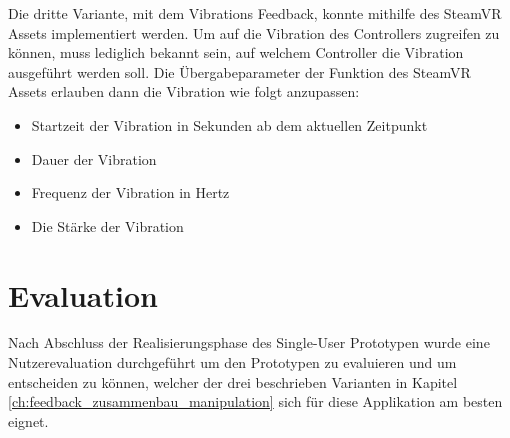 Die dritte Variante, mit dem Vibrations Feedback, konnte mithilfe des SteamVR Assets implementiert werden. Um auf die Vibration des Controllers zugreifen zu können, muss lediglich bekannt sein, auf welchem Controller die Vibration ausgeführt werden soll. Die Übergabeparameter der Funktion des SteamVR Assets erlauben dann die Vibration wie folgt anzupassen:

\begin{itemize} [itemsep=1pt,topsep=0pt]
	\item Startzeit der Vibration in Sekunden ab dem aktuellen Zeitpunkt
	\item Dauer der Vibration
	\item Frequenz der Vibration in Hertz
	\item Die Stärke der Vibration
\end{itemize}

\pagebreak
\section{Evaluation}
Nach Abschluss der Realisierungsphase des Single-User Prototypen wurde eine Nutzerevaluation durchgeführt um den Prototypen zu evaluieren und um entscheiden zu können, welcher der drei beschrieben Varianten in Kapitel \ref{ch:feedback_zusammenbau_manipulation} sich für diese Applikation am besten eignet. 


